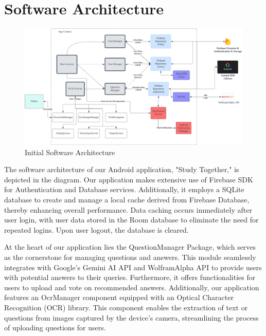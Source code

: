 \chapter{Software Architecture}\label{software_architecture}

\begin{figure}[h]
       \centering
       \includegraphics[width=\textwidth]{Figures/StudyTogether_Architecture.png}
       \caption{\footnotesize Initial Software Architecture}
       \label{StudyTogether_Architecture}
\end{figure}

The software architecture of our Android application, "Study Together," is depicted in the diagram. Our application makes extensive use of Firebase SDK for Authentication and Database services. Additionally, it employs a SQLite database to create and manage a local cache derived from Firebase Database, thereby enhancing overall performance. Data caching occurs immediately after user login, with user data stored in the Room database to eliminate the need for repeated logins. Upon user logout, the database is cleared.

At the heart of our application lies the QuestionManager Package, which serves as the cornerstone for managing questions and answers. This module seamlessly integrates with Google's Gemini AI API and WolframAlpha API to provide users with potential answers to their queries. Furthermore, it offers functionalities for users to upload and vote on recommended answers. Additionally, our application features an OcrManager component equipped with an Optical Character Recognition (OCR) library. This component enables the extraction of text or questions from images captured by the device's camera, streamlining the process of uploading questions for users.



